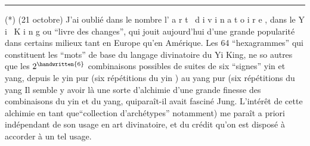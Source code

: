 \noindent\rule{.22\linewidth}{.4pt}\par
(*) (21 octobre) J'ai oublié dans le nombre l' a r t \ d i v i n a t o i r e , dans le Y i \ K i n g ou ``livre des changes'', qui jouit aujourd'hui d'une grande popularité dans certains milieux tant en Europe qu'en Amérique. Les 64 ``hexagrammes'' qui constituent les ``mots'' de base du langage divinatoire du Yi King, ne so autres que les $2^{\handwritten{6}}$ combinaisons possibles de suites de six ``signes'' yin et yang, depuis le yin pur (six répétitions du yin ) au yang pur (six répétitions du yang Il semble y avoir là une sorte d'alchimie d'une grande finesse des combinaisons du yin et du yang, qui\handwritten{(}paraît-il\handwritten{)} avait fasciné Jung. L'intérêt de cette alchimie \handwritten{(}en tant que``collection d'archétypes'' notamment) me paraît a priori indépendant de son usage en art divinatoire, et du crédit qu'on est disposé à accorder à un tel usage.

